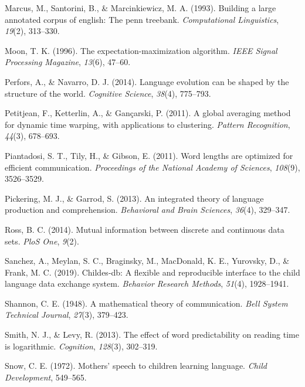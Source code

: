 \documentclass[
  english,
  man,floatsintext]{apa6}
\newlength{\cslhangindent}
\newenvironment{cslreferences}%
  {\setlength{\parindent}{0pt}%
  \everypar{\setlength{\hangindent}{\cslhangindent}}\ignorespaces}%
  {\par}
\begin{document}
\begin{cslreferences}
\leavevmode\hypertarget{ref-marcus1993}{}%
Marcus, M., Santorini, B., \& Marcinkiewicz, M. A. (1993). Building a large annotated corpus of english: The penn treebank. \emph{Computational Linguistics}, \emph{19}(2), 313--330.

\leavevmode\hypertarget{ref-moon1996}{}%
Moon, T. K. (1996). The expectation-maximization algorithm. \emph{IEEE Signal Processing Magazine}, \emph{13}(6), 47--60.

\leavevmode\hypertarget{ref-perfors2014language}{}%
Perfors, A., \& Navarro, D. J. (2014). Language evolution can be shaped by the structure of the world. \emph{Cognitive Science}, \emph{38}(4), 775--793.

\leavevmode\hypertarget{ref-petitjean2011}{}%
Petitjean, F., Ketterlin, A., \& Gançarski, P. (2011). A global averaging method for dynamic time warping, with applications to clustering. \emph{Pattern Recognition}, \emph{44}(3), 678--693.

\leavevmode\hypertarget{ref-piantadosi2011}{}%
Piantadosi, S. T., Tily, H., \& Gibson, E. (2011). Word lengths are optimized for efficient communication. \emph{Proceedings of the National Academy of Sciences}, \emph{108}(9), 3526--3529.

\leavevmode\hypertarget{ref-pickering2013}{}%
Pickering, M. J., \& Garrod, S. (2013). An integrated theory of language production and comprehension. \emph{Behavioral and Brain Sciences}, \emph{36}(4), 329--347.

\leavevmode\hypertarget{ref-ross2014}{}%
Ross, B. C. (2014). Mutual information between discrete and continuous data sets. \emph{PloS One}, \emph{9}(2).

\leavevmode\hypertarget{ref-sanchez2019}{}%
Sanchez, A., Meylan, S. C., Braginsky, M., MacDonald, K. E., Yurovsky, D., \& Frank, M. C. (2019). Childes-db: A flexible and reproducible interface to the child language data exchange system. \emph{Behavior Research Methods}, \emph{51}(4), 1928--1941.

\leavevmode\hypertarget{ref-shannon1948}{}%
Shannon, C. E. (1948). A mathematical theory of communication. \emph{Bell System Technical Journal}, \emph{27}(3), 379--423.

\leavevmode\hypertarget{ref-smith2013}{}%
Smith, N. J., \& Levy, R. (2013). The effect of word predictability on reading time is logarithmic. \emph{Cognition}, \emph{128}(3), 302--319.

\leavevmode\hypertarget{ref-snow1972}{}%
Snow, C. E. (1972). Mothers' speech to children learning language. \emph{Child Development}, 549--565.


\end{cslreferences}
\end{document}
